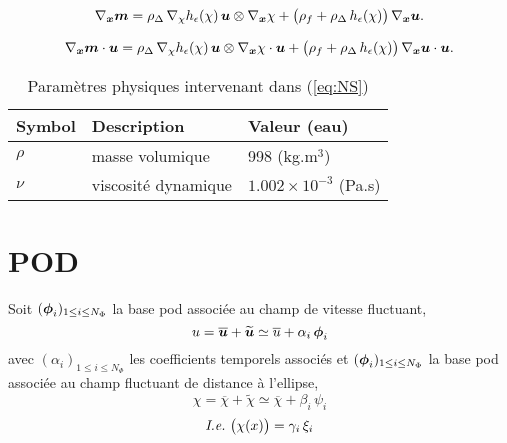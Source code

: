 \documentclass[10pt,a4paper]{article}
\begin{document}
$$ \nabla_{\boldsymbol{x}} {\boldsymbol{m}} = \rho_\Delta\,\nabla_{\chi}h_{\epsilon}(\chi)\, \boldsymbol{u} \otimes \nabla_{\boldsymbol{x}} {\chi}  + \big(\rho_f + \rho_\Delta\,h_{\epsilon}(\chi)\big)\, \nabla_{\boldsymbol{x}} {\boldsymbol{u}}.$$

$$ \nabla_{\boldsymbol{x}} {\boldsymbol{m}}\cdot \boldsymbol{u} = \rho_\Delta\,\nabla_{\chi}h_{\epsilon}(\chi)\,\boldsymbol{u} \otimes \nabla_{\boldsymbol{x}} {\chi} \cdot \boldsymbol{u}  + \big(\rho_f + \rho_\Delta\,h_{\epsilon}(\chi)\big)\, \nabla_{\boldsymbol{x}} {\boldsymbol{u}} \cdot \boldsymbol{u}.$$

\begin{table}[!h]
\centering
\begin{tabular}{lll}
\hline
Symbol & Description & Valeur (eau)\\
\hline
$\rho$ & masse volumique & 998 (kg.m$^3$)\\
$\nu$ & viscosité dynamique & $1.002\times 10^{-3}$ (Pa.s)\\
\hline
\end{tabular}
\caption{\label{tab:parametres_physiques} Paramètres physiques intervenant dans (\ref{eq:NS})}
\end{table}
%
%
\section{POD}
%
%
Soit $(\boldsymbol{\phi}_i)_{1\leq i \leq N_\Phi}$ la base pod associée au champ de vitesse fluctuant, \ie
$$u = \overline{\boldsymbol{u}} + \widetilde{\boldsymbol{u}} \simeq \overline{u} + \alpha_i\,\boldsymbol{\phi}_i$$
%
avec $(\alpha_i)_{1 \leq i \leq N_\Phi}$ les coefficients temporels associés et $(\boldsymbol{\phi}_i)_{1\leq i \leq N_\Phi}$ la base pod associée au champ fluctuant de distance à l'ellipse, \ie
%
$$\chi = \overline{\chi} + \widetilde \chi \simeq \overline{\chi} + \beta_i\,\psi_i$$
%
$$\textit{I.e.}~\big(\chi(x)\big) = \gamma_i \, \xi_i$$
%
%
\end{document}
